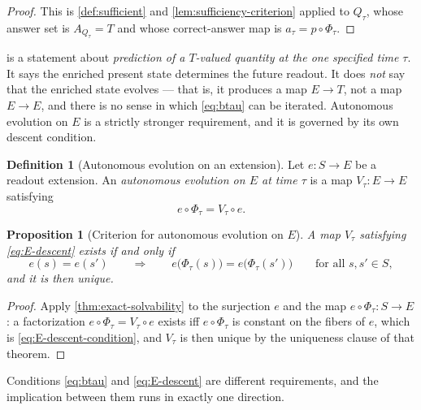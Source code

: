 \documentclass[11pt,reqno]{amsart}
\theoremstyle{plain}
\newtheorem{proposition}[theorem]{Proposition}
\theoremstyle{definition}
\newtheorem{definition}[theorem]{Definition}
\newcommand{\Src}{S}
\newcommand{\Rdt}{T}
\begin{document}
\begin{proof}
This is \cref{def:sufficient} and \cref{lem:sufficiency-criterion} applied to $Q_\tau$, whose
answer set is $A_{Q_\tau}=\Rdt$ and whose correct-answer map is $a_\tau=p\circ\Phi_\tau$.
\end{proof}

 is a statement about \emph{prediction of a $\Rdt$-valued quantity at the
one specified time $\tau$}. It says the enriched present state determines the future readout. It
does \emph{not} say that the enriched state evolves --- that is, it produces a map $E\to\Rdt$, not
a map $E\to E$, and there is no sense in which \eqref{eq:btau} can be iterated. Autonomous
evolution on $E$ is a strictly stronger requirement, and it is governed by its own descent
condition.

\begin{definition}[Autonomous evolution on an extension]\label{def:autonomous-E}
Let $e\colon\Src\to E$ be a readout extension. An \emph{autonomous evolution on $E$ at time
$\tau$} is a map $V_\tau\colon E\to E$ satisfying
\begin{equation}\label{eq:E-descent}
e\circ\Phi_\tau=V_\tau\circ e .
\end{equation}
\end{definition}

\begin{proposition}[Criterion for autonomous evolution on $E$]\label{prop:autonomous-criterion}
A map $V_\tau$ satisfying \eqref{eq:E-descent} exists if and only if
\begin{equation}\label{eq:E-descent-condition}
e(s)=e(s')
\qquad\Longrightarrow\qquad
e\bigl(\Phi_\tau(s)\bigr)=e\bigl(\Phi_\tau(s')\bigr)
\qquad\text{for all } s,s'\in\Src ,
\end{equation}
and it is then unique.
\end{proposition}

\begin{proof}
Apply \cref{thm:exact-solvability} to the surjection $e$ and the map $e\circ\Phi_\tau\colon
\Src\to E$: a factorization $e\circ\Phi_\tau=V_\tau\circ e$ exists iff $e\circ\Phi_\tau$ is
constant on the fibers of $e$, which is \eqref{eq:E-descent-condition}, and $V_\tau$ is then
unique by the uniqueness clause of that theorem.
\end{proof}

Conditions \eqref{eq:btau} and \eqref{eq:E-descent} are different requirements, and the
implication between them runs in exactly one direction.
\end{document}
